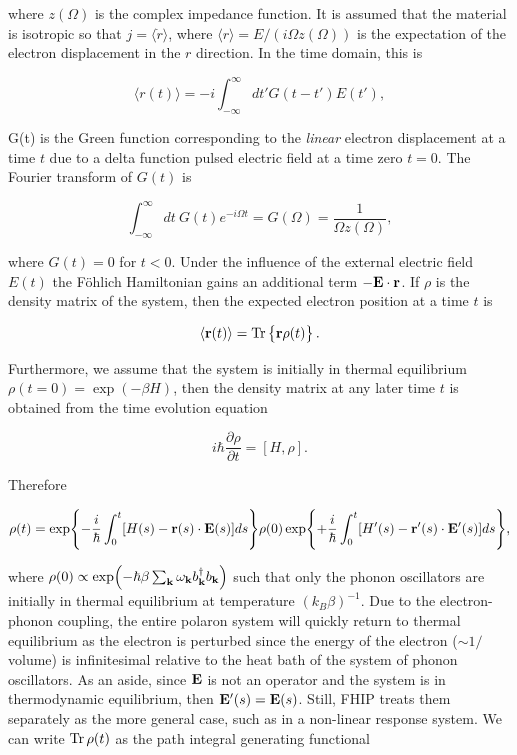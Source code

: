 where $z(\Omega)$ is the complex impedance function. It is assumed that the material is isotropic so that $j = \langle \dot{r} \rangle$, where $\langle r \rangle = E / (i\Omega z(\Omega))$ is the expectation of the electron displacement in the $r$ direction. In the time domain, this is

\begin{equation}
    \langle r(t) \rangle = -i \int^\infty_{-\infty} dt' G(t - t') E(t') ,
\end{equation}

G(t) is the Green function corresponding to the \emph{linear} electron displacement at a time $t$ due to a delta function pulsed electric field at a time zero $t = 0$. The Fourier transform of $G(t)$ is

\begin{equation}
    \int^\infty_{-\infty} dt\ G(t) e^{-i\Omega t} = G(\Omega) = \frac{1}{\Omega z(\Omega)},
\end{equation}

where $G(t) = 0$ for $t < 0$. Under the influence of the external electric field $E(t)$ the F\"ohlich Hamiltonian gains an additional term $- \vb{E} \cdot \vb{r}$. If $\rho$ is the density matrix of the system, then the expected electron position at a time $t$ is

\begin{equation}
    \langle \vb{r}(t) \rangle = \Tr \left\{ \vb{r} \rho(t) \right\}.
\end{equation}

Furthermore, we assume that the system is initially in thermal equilibrium $\rho(t = 0) = \exp(-\beta H)$, then the density matrix at any later time $t$ is obtained from the time evolution equation

\begin{equation}
    i\hbar \frac{\partial \rho}{\partial t} = [H, \rho].
\end{equation}

Therefore

\begin{equation}
    \rho(t) = \exp{-\frac{i}{\hbar}\int^{t}_0 [H(s)- \vb{r}(s)\cdot\vb{E}(s)] ds} \rho(0) \exp{+\frac{i}{\hbar}\int^t_0 [H'(s) - \vb{r'}(s)\cdot\vb{E'}(s)] ds},
\end{equation}

where $\rho(0) \propto \exp(-\hbar \beta \sum_{\vb{k}} \omega_{\vb{k}} b^\dagger_{\vb{k}} b_{\vb{k}})$ such that only the phonon oscillators are initially in thermal equilibrium at temperature $(k_B \beta)^{-1}$. Due to the electron-phonon coupling, the entire polaron system will quickly return to thermal equilibrium as the electron is perturbed since the energy of the electron ($\sim 1/$volume) is infinitesimal relative to the heat bath of the system of phonon oscillators. As an aside, since $\vb{E}$ is not an operator and the system is in thermodynamic equilibrium, then $\vb{E'}(s) = \vb{E}(s)$. Still, FHIP treats them separately as the more general case, such as in a non-linear response system. We can write $\Tr \rho(t)$ as the path integral generating functional

